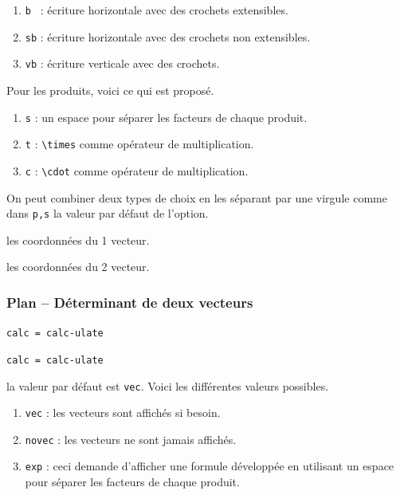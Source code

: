 \documentclass[12pt,a4paper]{book}
\newcommand\env[1]{\texttt{#1}}
\newcommand\macro[1]{\env{\textbackslash{}#1}}
\theoremstyle{definition}
\newcommand\mwhyprefix[2]{%
	\texttt{#1 = #1-#2}%
}
\newcommand\prefix[1]{%
	\texttt{#1}%
}
\begin{document}
{{\begin{enumerate}
	\medskip
	
	\item \verb+b + : écriture horizontale avec des crochets extensibles.

	\item \verb+sb+ : écriture horizontale avec des crochets non extensibles.

	\item \verb+vb+ : écriture verticale avec des crochets.
\end{enumerate}

            Pour les produits, voici ce qui est proposé.
\begin{enumerate}
	\item \prefix{s} : un espace pour séparer les facteurs de chaque produit.

	\item \prefix{t} : \macro{times} comme opérateur de multiplication.

	\item \prefix{c} : \macro{cdot} comme opérateur de multiplication.
\end{enumerate}

            On peut combiner deux types de choix en les séparant par une virgule comme dans \verb+p,s+ la valeur par défaut de l'option.


 les coordonnées du 1\ier{} vecteur.

 les coordonnées du 2\ieme{} vecteur.


\subsubsection{Plan -- Déterminant de deux vecteurs} \label{tnsgeo-colinearity-criteria}



 \hfill \mwhyprefix{calc}{ulate}

 \hfill \mwhyprefix{calc}{ulate}


\IDoption{} la valeur par défaut est \verb+vec+. Voici les différentes valeurs possibles.
\begin{enumerate}
	\item \verb+vec+ : les vecteurs sont affichés si besoin.

	\item \verb+novec+ : les vecteurs ne sont jamais affichés.

	\item \verb+exp+ : ceci demande d'afficher une formule développée en utilisant un espace pour séparer les facteurs de chaque produit.


\end{enumerate}}}
\end{document}
